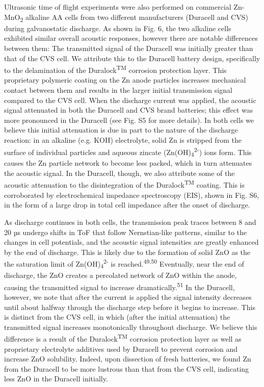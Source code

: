 \documentclass[]{article}
\begin{document}
{ }Ultrasonic time of flight experiments were also performed on
commercial Zn-MnO\textsubscript{2} alkaline AA cells from two different
manufacturers (Duracell and CVS) during galvanostatic discharge. As
shown in Fig. 6, the two alkaline cells exhibited similar overall
acoustic responses, however there are notable differences between them:
The transmitted signal of the Duracell was initially greater than that
of the CVS cell. We attribute this to the Duracell battery design,
specifically to the delamination of the Duralock\textsuperscript{TM}
corrosion protection layer. This proprietary polymeric coating on the Zn
anode particles increases mechanical contact between them and results in
the larger initial transmission signal compared to the CVS cell. When
the discharge current was applied, the acoustic signal attenuated in
both the Duracell and CVS brand batteries; this effect was more
pronounced in the Duracell (see Fig. S5 for more details). In both cells
we believe this initial attenuation is due in part to the nature of the
discharge reaction: in an alkaline (e.g. KOH) electrolyte, solid Zn is
stripped from the surface of individual particles and aqueous zincate
(Zn(OH)\textsubscript{4}\textsuperscript{2-}) ions form. This causes the
Zn particle network to become less packed, which in turn attenuates the
acoustic signal. In the Duracell, though, we also attribute some of the
acoustic attenuation to the disintegration of the
Duralock\textsuperscript{TM} coating. This is corroborated by
electrochemical impedance spectroscopy (EIS), shown in Fig. S6, in the
form of a large drop in total cell impedance after the onset of
discharge.

{ }As discharge continues in both cells, the transmission peak traces
between 8 and 20 µs undergo shifts in ToF that follow Nernstian-like
patterns, similar to the changes in cell potentials, and the acoustic
signal intensities are greatly enhanced by the end of discharge. This is
likely due to the formation of solid ZnO as the the saturation limit of
Zn(OH)\textsubscript{4}\textsuperscript{2-} is
reached.\textsuperscript{49,50} Eventually, near the end of discharge,
the ZnO creates a percolated network of ZnO within the anode, causing
the transmitted signal to increase dramatically.\textsuperscript{51} In
the Duracell, however, we note that after the current is applied the
signal intensity decreases until about halfway through the discharge
step before it begins to increase. This is distinct from the CVS cell,
in which (after the initial attenuation) the transmitted signal
increases monotonically throughout discharge. We believe this difference
is a result of the Duralock\textsuperscript{TM} corrosion protection
layer as well as proprietary electrolyte additives used by Duracell to
prevent corrosion and increase ZnO solubility. Indeed, upon dissection
of fresh batteries, we found Zn from the Duracell to be more lustrous
than that from the CVS cell, indicating less ZnO in the Duracell
initially.{~}
\end{document}

